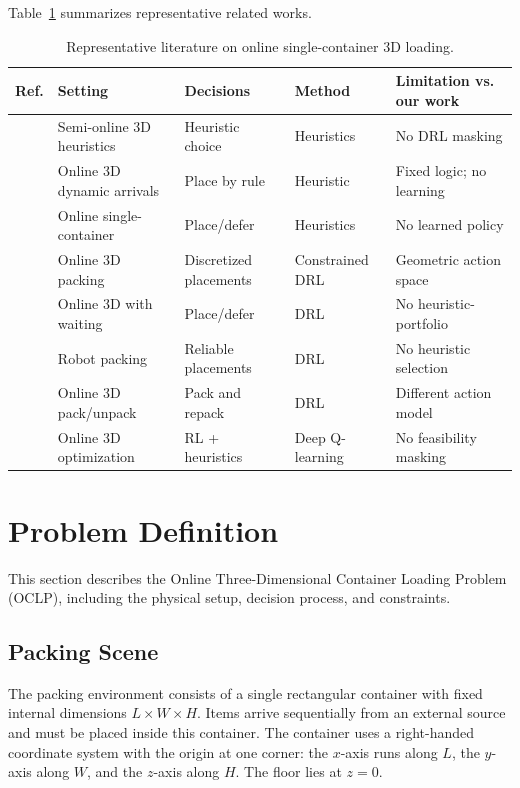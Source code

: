 \documentclass[runningheads]{llncs}
\begin{document}
Table~\ref{tab:literature} summarizes representative related works.

\begin{table}[t]\small
\centering
\caption{Representative literature on online single-container 3D loading.}
\label{tab:literature}
\setlength{\tabcolsep}{3pt}
\renewcommand{\arraystretch}{1.05}
\begin{tabular}{p{0.5cm}p{2.8cm}p{2.2cm}p{1.5cm}p{4.2cm}}
\toprule
Ref. & Setting & Decisions & Method & Limitation vs. our work \\
\midrule
\cite{Ali2024} & Semi-online 3D heuristics & Heuristic choice & Heuristics & No DRL masking \\
\cite{Ha2017} & Online 3D dynamic arrivals & Place by rule & Heuristic & Fixed logic; no learning \\
\cite{david} & Online single-container & Place/defer & Heuristics & No learned policy \\
\cite{zhao} & Online 3D packing & Discretized placements & Constrained DRL & Geometric action space \\
\cite{Zhang2024} & Online 3D with waiting & Place/defer & DRL & No heuristic-portfolio \\
\cite{Xiong2023} & Robot packing & Reliable placements & DRL & No heuristic selection \\
\cite{Song2023} & Online 3D pack/unpack & Pack and repack & DRL & Different action model \\
\cite{Wong2024} & Online 3D optimization & RL + heuristics & Deep Q-learning & No feasibility masking \\
\bottomrule
\end{tabular}
\end{table}

\section{Problem Definition}

This section describes the Online Three-Dimensional Container Loading Problem (OCLP), including the physical setup, decision process, and constraints.

\subsection{Packing Scene}
The packing environment consists of a single rectangular container with fixed internal dimensions $L \times W \times H$. Items arrive sequentially from an external source and must be placed inside this container. The container uses a right-handed coordinate system with the origin at one corner: the $x$-axis runs along $L$, the $y$-axis along $W$, and the $z$-axis along $H$. The floor lies at $z = 0$.
\end{document}
